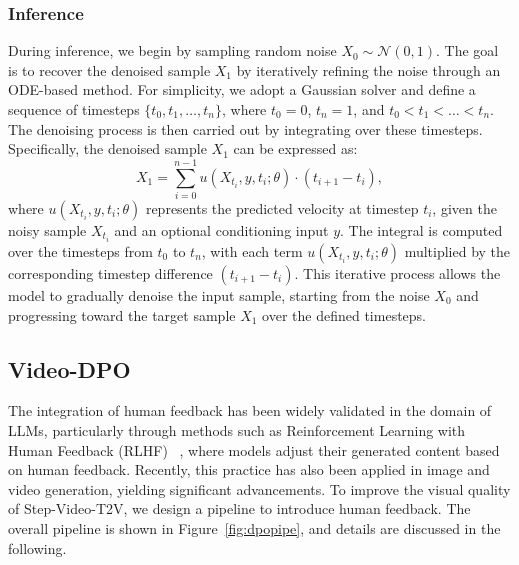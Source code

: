 \subsubsection{Inference}
During inference, we begin by sampling random noise $X_0 \sim \mathcal{N}(0, 1)$. The goal is to recover the denoised sample $X_1$ by iteratively refining the noise through an ODE-based method. For simplicity, we adopt a Gaussian solver and define a sequence of timesteps $\{ t_0, t_1, \dots, t_n \}$, where $t_0 = 0$, $t_n = 1$, and $t_0 < t_1 < \dots < t_n$. The denoising process is then carried out by integrating over these timesteps. Specifically, the denoised sample $X_1$ can be expressed as:
\begin{equation}
    X_1 = \sum_{i=0}^{n-1} u(X_{t_i}, y, t_i; \theta) \cdot (t_{i+1} - t_i),
\end{equation}
where $u(X_{t_i}, y, t_i; \theta)$ represents the predicted velocity at timestep $t_i$, given the noisy sample $X_{t_i}$ and an optional conditioning input $y$. The integral is computed over the timesteps from $t_0$ to $t_n$, with each term $u(X_{t_i}, y, t_i; \theta)$ multiplied by the corresponding timestep difference $(t_{i+1} - t_i)$.
This iterative process allows the model to gradually denoise the input sample, starting from the noise $X_0$ and progressing toward the target sample $X_1$ over the defined timesteps.





\subsection{Video-DPO}
\label{dpo}  


The integration of human feedback has been widely validated in the domain of LLMs, particularly through methods such as Reinforcement Learning with Human Feedback (RLHF) ~\cite{ouyang2022training,christiano2017deep}, where models adjust their generated content based on human feedback. Recently, this practice has also been applied in image and video generation, yielding significant advancements. To improve the visual quality of Step-Video-T2V, we design a pipeline to introduce human feedback. 
The overall pipeline is shown in Figure~\ref{fig:dpopipe}, and details are discussed in the following.

